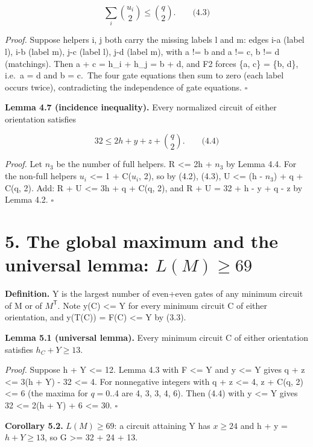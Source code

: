 \[
\sum_i\binom{u_i}{2}\le\binom q2.\qquad\text{(4.3)}
\]

\emph{Proof.} Suppose helpers i, j both carry the missing labels l and m: edges i-a (label l), i-b (label m), j-c (label l), j-d (label m), with a != b and a != c, b != d (matchings). Then a + c = h\_i + h\_j = b + d, and F2 forces \{a, c\} = \{b, d\}, i.e.~a = d and b = c.~The four gate equations then sum to zero (each label occurs twice), contradicting the independence of gate equations. \(\square\)

\textbf{Lemma 4.7 (incidence inequality).} Every normalized circuit of either orientation satisfies

\[
32\le2h+y+z+\binom q2.\qquad\text{(4.4)}
\]

\emph{Proof.} Let \(n_3\) be the number of full helpers. R \textless= 2h + \(n_3\) by Lemma 4.4. For the non-full helpers \(u_i\) \textless= 1 + C(\(u_i\), 2), so by (4.2), (4.3), U \textless= (h - \(n_3\)) + q + C(q, 2). Add: R + U \textless= 3h + q + C(q, 2), and R + U = 32 + h - y + q - z by Lemma 4.2. \(\square\)

\hypertarget{the-global-maximum-and-the-universal-lemma-lmge69}{%
\section{\texorpdfstring{5. The global maximum and the universal lemma: \(L(M)\ge69\)}{5. The global maximum and the universal lemma: L(M)\textbackslash ge69}}\label{the-global-maximum-and-the-universal-lemma-lmge69}}

\textbf{Definition.} Y is the largest number of even+even gates of any minimum circuit of M or of \(M^{\mathsf T}\). Note y(C) \textless= Y for every minimum circuit C of either orientation, and y(T(C)) = F(C) \textless= Y by (3.3).

\textbf{Lemma 5.1 (universal lemma).} Every minimum circuit C of either orientation satisfies \(h_C+Y\ge13\).

\emph{Proof.} Suppose h + Y \textless= 12. Lemma 4.3 with F \textless= Y and y \textless= Y gives q + z \textless= 3(h + Y) - 32 \textless= 4. For nonnegative integers with q + z \textless= 4, z + C(q, 2) \textless= 6 (the maxima for \(q=0\)..4 are 4, 3, 3, 4, 6). Then (4.4) with y \textless= Y gives 32 \textless= 2(h + Y) + 6 \textless= 30. \(\square\)

\textbf{Corollary 5.2.} \(L(M)\ge69\): a circuit attaining Y has \(x\ge24\) and h + y = \(h+Y\ge13\), so G \textgreater= 32 + 24 + 13.

